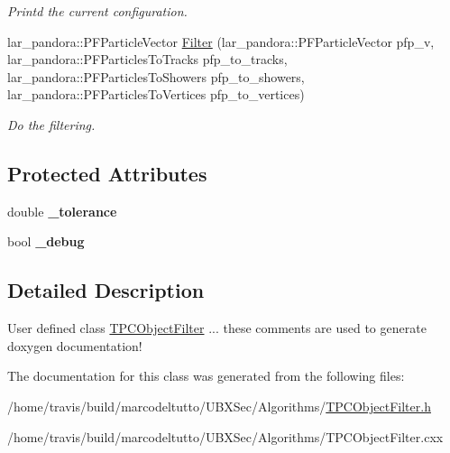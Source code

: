 \begin{DoxyCompactItemize}
\begin{DoxyCompactList}\small\item\em \-Printd the current configuration. \end{DoxyCompactList}\item 
\hypertarget{classubana_1_1TPCObjectFilter_ab485fca5770b8a9622d56c294b361ef3}{lar\-\_\-pandora\-::\-P\-F\-Particle\-Vector \hyperlink{classubana_1_1TPCObjectFilter_ab485fca5770b8a9622d56c294b361ef3}{\-Filter} (lar\-\_\-pandora\-::\-P\-F\-Particle\-Vector pfp\-\_\-v, lar\-\_\-pandora\-::\-P\-F\-Particles\-To\-Tracks pfp\-\_\-to\-\_\-tracks, lar\-\_\-pandora\-::\-P\-F\-Particles\-To\-Showers pfp\-\_\-to\-\_\-showers, lar\-\_\-pandora\-::\-P\-F\-Particles\-To\-Vertices pfp\-\_\-to\-\_\-vertices)}\label{classubana_1_1TPCObjectFilter_ab485fca5770b8a9622d56c294b361ef3}

\begin{DoxyCompactList}\small\item\em \-Do the filtering. \end{DoxyCompactList}\end{DoxyCompactItemize}
\subsection*{\-Protected \-Attributes}
\begin{DoxyCompactItemize}
\item 
\hypertarget{classubana_1_1TPCObjectFilter_a86137c0a525fdd2b5a63afe4ff79c23c}{double {\bfseries \-\_\-tolerance}}\label{classubana_1_1TPCObjectFilter_a86137c0a525fdd2b5a63afe4ff79c23c}

\item 
\hypertarget{classubana_1_1TPCObjectFilter_a44156494ed6ccc98d9016c2c4306f282}{bool {\bfseries \-\_\-debug}}\label{classubana_1_1TPCObjectFilter_a44156494ed6ccc98d9016c2c4306f282}

\end{DoxyCompactItemize}


\subsection{\-Detailed \-Description}
\-User defined class \hyperlink{classubana_1_1TPCObjectFilter}{\-T\-P\-C\-Object\-Filter} ... these comments are used to generate doxygen documentation! 

\-The documentation for this class was generated from the following files\-:\begin{DoxyCompactItemize}
\item 
/home/travis/build/marcodeltutto/\-U\-B\-X\-Sec/\-Algorithms/\hyperlink{TPCObjectFilter_8h}{\-T\-P\-C\-Object\-Filter.\-h}\item 
/home/travis/build/marcodeltutto/\-U\-B\-X\-Sec/\-Algorithms/\-T\-P\-C\-Object\-Filter.\-cxx\end{DoxyCompactItemize}
